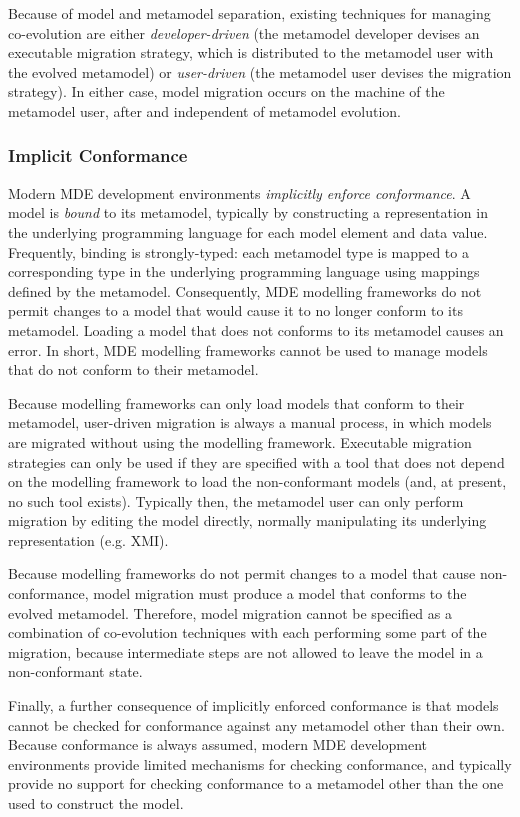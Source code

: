 Because of model and metamodel separation, existing techniques for managing co-evolution are either \emph{developer-driven} (the metamodel developer devises an executable migration strategy, which is distributed to the metamodel user with the evolved metamodel) or \emph{user-driven} (the metamodel user devises the migration strategy). In either case, model migration occurs on the machine of the metamodel user, after and independent of metamodel evolution.


\subsubsection{Implicit Conformance}
Modern MDE development environments \emph{implicitly enforce conformance}. A model is \emph{bound} to its metamodel, typically by constructing a representation in the underlying programming language for each model element and data value. Frequently, binding is strongly-typed: each metamodel type is mapped to a corresponding type in the underlying programming language using mappings defined by the metamodel. Consequently, MDE modelling frameworks do not permit changes to a model that would cause it to no longer conform to its metamodel. Loading a model that does not conforms to its metamodel causes an error. In short, MDE modelling frameworks cannot be used to manage models that do not conform to their metamodel.

Because modelling frameworks can only load models that conform to their metamodel, user-driven migration is always a manual process, in which models are migrated without using the modelling framework. Executable migration strategies can only be used if they are specified with a tool that does not depend on the modelling framework to load the non-conformant models (and, at present, no such tool exists). Typically then, the metamodel user can only perform migration by editing the model directly, normally manipulating its underlying representation (e.g. XMI).

Because modelling frameworks do not permit changes to a model that cause non-conformance, model migration must produce a model that conforms to the evolved metamodel. Therefore, model migration cannot be specified as a combination of co-evolution techniques with each performing some part of the migration, because intermediate steps are not allowed to leave the model in a non-conformant state.

Finally, a further consequence of implicitly enforced conformance is that models cannot be checked for conformance against any metamodel other than their own. Because conformance is always assumed, modern MDE development environments provide limited mechanisms for checking conformance, and typically provide no support for checking conformance to a metamodel other than the one used to construct the model.



